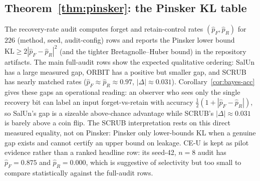 \documentclass[11pt]{article}
\begin{document}
\subsection{Theorem~\ref{thm:pinsker}: the Pinsker KL table}
The recovery-rate audit computes forget and retain-control rates $(\hat p_F, \hat p_R)$ for $226$ (method, seed, audit-config) rows and reports the Pinsker lower bound $\mathrm{KL} \geq 2|\hat p_F - \hat p_R|^2$ (and the tighter Bretagnolle--Huber bound) in the repository artifacts. The main full-audit rows show the expected qualitative ordering: SalUn has a large measured gap, ORBIT has a positive but smaller gap, and SCRUB has nearly matched rates ($\hat p_F \approx \hat p_R \approx 0.97$, $|\Delta| \approx 0.031$). Corollary~\ref{cor:bayes-acc} gives these gaps an operational reading: an observer who sees only the single recovery bit can label an input forget-vs-retain with accuracy $\tfrac{1}{2}(1+|\hat p_F-\hat p_R|)$, so SalUn's gap is a sizeable above-chance advantage while SCRUB's $|\Delta|\approx0.031$ is barely above a coin flip. The SCRUB interpretation rests on this direct measured equality, not on Pinsker: Pinsker only lower-bounds KL when a genuine gap exists and cannot certify an upper bound on leakage. CE-U is kept as pilot evidence rather than a ranked headline row: its seed-42, $n=8$ audit has $\hat p_F = 0.875$ and $\hat p_R = 0.000$, which is suggestive of selectivity but too small to compare statistically against the full-audit rows.
\end{document}
